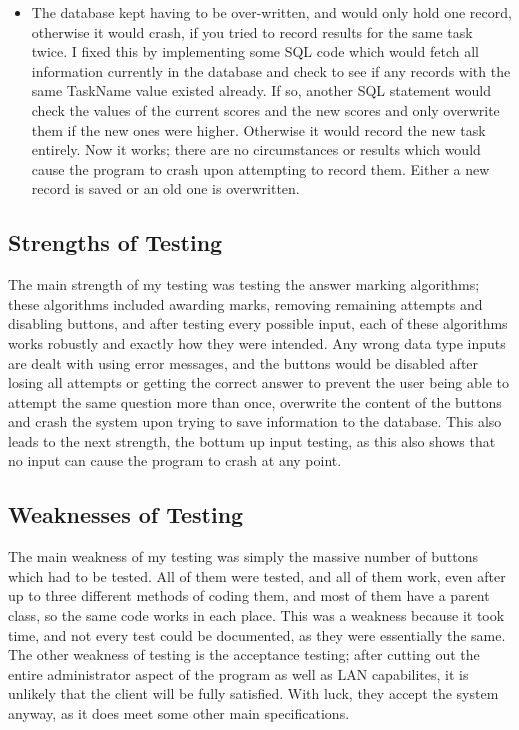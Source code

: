 \begin{itemize}
\item The database kept having to be over-written, and would only hold one record, otherwise it would crash, if you tried to record results for the same task twice. I fixed this by implementing some SQL code which would fetch all information currently in the database and check to see if any records with the same TaskName value existed already. If so, another SQL statement would check the values of the current scores and the new scores and only overwrite them if the new ones were higher. Otherwise it would record the new task entirely. Now it works; there are no circumstances or results which would cause the program to crash upon attempting to record them. Either a new record is saved or an old one is overwritten.

\end{itemize}

\subsection{Strengths of Testing}

The main strength of my testing was testing the answer marking algorithms; these algorithms included awarding marks, removing remaining attempts and disabling buttons, and after testing every possible input, each of these algorithms works robustly and exactly how they were intended. Any wrong data type inputs are dealt with using error messages, and the buttons would be disabled after losing all attempts or getting the correct answer to prevent the user being able to attempt the same question more than once, overwrite the content of the buttons and crash the system upon trying to save information to the database. This also leads to the next strength, the bottum up input testing, as this also shows that no input can cause the program to crash at any point.

\subsection{Weaknesses of Testing}

The main weakness of my testing was simply the massive number of buttons which had to be tested. All of them were tested, and all of them work, even after up to three different methods of coding them, and most of them have a parent class, so the same code works in each place. This was a weakness because it took time, and not every test could be documented, as they were essentially the same. The other weakness of testing is the acceptance testing; after cutting out the entire administrator aspect of the program as well as LAN capabilites, it is unlikely that the client will be fully satisfied. With luck, they accept the system anyway, as it does meet some other main specifications.

